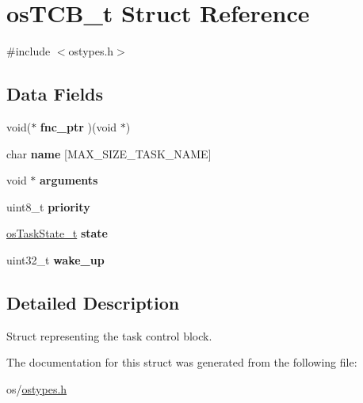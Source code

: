 \hypertarget{structos_t_c_b__t}{}\section{os\+T\+C\+B\+\_\+t Struct Reference}
\label{structos_t_c_b__t}


{\ttfamily \#include $<$ostypes.\+h$>$}

\subsection*{Data Fields}
\begin{DoxyCompactItemize}
\item 
\mbox{\label{structos_t_c_b__t_aa99c587c00df01f56baf5c6e46c46361}} 
void($\ast$ {\bfseries fnc\+\_\+ptr} )(void $\ast$)
\item 
\mbox{\label{structos_t_c_b__t_a053fb83c9604d11fa3b97113a1cee7c9}} 
char {\bfseries name} \mbox{[}M\+A\+X\+\_\+\+S\+I\+Z\+E\+\_\+\+T\+A\+S\+K\+\_\+\+N\+A\+ME\mbox{]}
\item 
\mbox{\label{structos_t_c_b__t_ab019aab8795fa409075f1956083bfd62}} 
void $\ast$ {\bfseries arguments}
\item 
\mbox{\label{structos_t_c_b__t_a0ad043071ccc7a261d79a759dc9c6f0c}} 
uint8\+\_\+t {\bfseries priority}
\item 
\mbox{\label{structos_t_c_b__t_a602c451f173294fef0097bb86d082602}} 
\hyperlink{ostypes_8h_ae410cf8fbf1704d3cedf2e2648b94a55}{os\+Task\+State\+\_\+t} {\bfseries state}
\item 
\mbox{\label{structos_t_c_b__t_aabdd8be14846d97f622cacdbdaaa5925}} 
uint32\+\_\+t {\bfseries wake\+\_\+up}
\end{DoxyCompactItemize}


\subsection{Detailed Description}
Struct representing the task control block. 

The documentation for this struct was generated from the following file\+:\begin{DoxyCompactItemize}
\item 
os/\hyperlink{ostypes_8h}{ostypes.\+h}\end{DoxyCompactItemize}
